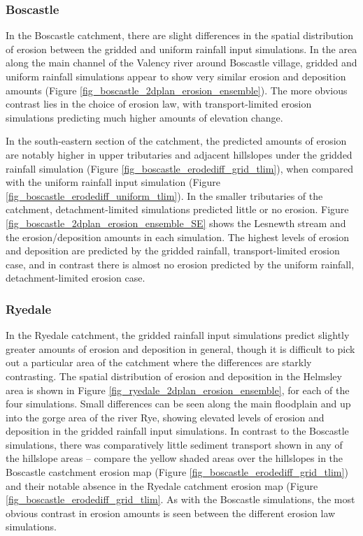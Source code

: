 \subsubsection{Boscastle}
In the Boscastle catchment, there are slight differences in the spatial distribution of erosion between the gridded and uniform rainfall input simulations. In the area along the main channel of the Valency river around Boscastle village, gridded and uniform rainfall simulations appear to show very similar erosion and deposition amounts (Figure \ref{fig_boscastle_2dplan_erosion_ensemble}). The more obvious contrast lies in the choice of erosion law, with transport-limited erosion simulations predicting much higher amounts of elevation change.

In the south-eastern section of the catchment, the predicted amounts of erosion are notably higher in upper tributaries and adjacent hillslopes under the gridded rainfall simulation (Figure \ref{fig_boscastle_erodediff_grid_tlim}), when compared with the uniform rainfall input simulation (Figure \ref{fig_boscastle_erodediff_uniform_tlim}). In the smaller tributaries of the catchment, detachment-limited simulations predicted little or no erosion. Figure \ref{fig_boscastle_2dplan_erosion_ensemble_SE} shows the Lesnewth stream and the erosion/deposition amounts in each simulation. The highest levels of erosion and deposition are predicted by the gridded rainfall, transport-limited erosion case, and in contrast there is almost no erosion predicted by the uniform rainfall, detachment-limited erosion case.


\subsubsection{Ryedale}
In the Ryedale catchment, the gridded rainfall input simulations predict slightly greater amounts of erosion and deposition in general, though it is difficult to pick out a particular area of the catchment where the differences are starkly contrasting. The spatial distribution of erosion and deposition in the Helmsley area is shown in Figure \ref{fig_ryedale_2dplan_erosion_ensemble}, for each of the four simulations. Small differences can be seen along the main floodplain and up into the gorge area of the river Rye, showing elevated levels of erosion and deposition in the gridded rainfall input simulations. In contrast to the Boscastle simulations, there was comparatively little sediment transport shown in any of the hillslope areas -- compare the yellow shaded areas over the hillslopes in the Boscastle castchment erosion map (Figure \ref{fig_boscastle_erodediff_grid_tlim}) and their notable absence in the Ryedale catchment erosion map (Figure \ref{fig_boscastle_erodediff_grid_tlim}.
As with the Boscastle simulations, the most obvious contrast in erosion amounts is seen between the different erosion law simulations.


